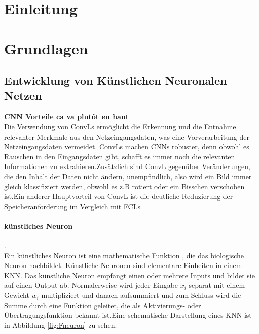 \documentclass[12pt,a4paper]{scrartcl}
\numberwithin{equation}{section}
\newcommand{\R}{\mathbb{R}} %
\begin{document}
  \tableofcontents
  \listoffigures

\newpage
 


  \pagestyle{headings}

\section{Einleitung}



 \newpage  %
 
\section{Grundlagen}
\subsection{Entwicklung von Künstlichen Neuronalen Netzen }

\textbf{\ac{CNN} Vorteile ca va plutôt en haut}\\ 
Die Verwendung von \acsp{ConvL} ermöglicht die Erkennung und die Entnahme relevanter Merkmale aus den Netzeingangsdaten, was eine Vorverarbeitung der Netzeingangsdaten vermeidet. \acsp{ConvL} machen \acsp{CNN} robuster, denn obwohl es Rauschen in den Eingangsdaten gibt, schafft es immer noch die relevanten Informationen zu extrahieren.Zusätzlich sind \ac{ConvL}  gegenüber Veränderungen, die den Inhalt der Daten nicht ändern, unempfindlich, also wird ein Bild immer gleich klassifiziert werden, obwohl es z.B rotiert oder ein Bisschen verschoben ist.Ein anderer Hauptvorteil von \ac{ConvL} ist die deutliche Reduzierung der Speicheranforderung im Vergleich mit \acsp{FCL} 
\paragraph{künstliches Neuron}.\\
Ein künstliches Neuron\cite{kneuron} ist eine mathematische Funktion
, die das biologische Neuron nachbildet. Künstliche Neuronen sind elementare Einheiten in einem \ac{KNN}. Das künstliche Neuron empfängt einen oder mehrere Inputs und bildet sie auf einen Output ab. Normalerweise wird jeder Eingabe $ x_i $ separat mit einem Gewicht $ w_i $ multipliziert und danach aufsummiert und zum Schluss wird die Summe durch eine Funktion geleitet, die als Aktivierungs- oder Übertragungsfunktion bekannt ist.Eine schematische Darstellung eines \ac{KNN} ist in Abbildung \ref{fig:Fneuron}
zu sehen.
\end{document}
